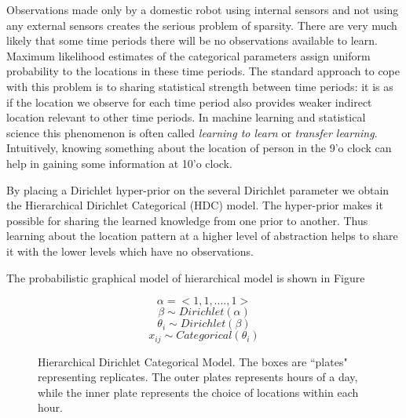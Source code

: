 Observations made only by a domestic robot using internal sensors and not using any external sensors creates the serious problem of sparsity. There are very much likely that some time periods there will be no observations available to learn. Maximum likelihood estimates of the categorical parameters assign uniform probability to the locations in these time periods. The standard approach to cope with this problem is to sharing statistical strength between time periods: it is as if the location we observe for each time period also provides weaker indirect location relevant to other time periods. In machine learning and statistical science this phenomenon is often called \emph{learning to learn} or \emph{transfer learning}. Intuitively, knowing something about the location of person in the 9'o clock can help in gaining some information at 10'o clock. 

By placing a Dirichlet hyper-prior on the several Dirichlet parameter we obtain the  Hierarchical Dirichlet Categorical  (HDC) model. The hyper-prior makes it possible for sharing the learned knowledge from one prior to another. Thus learning about the location pattern at a higher level of abstraction helps to share it with the lower levels which have no observations.

The probabilistic graphical model of  hierarchical model is shown in Figure \cite{hdcm}

\noindent
\begin{figure}[htp]

\begin{minipage}{0.3\textwidth}
\centering


\end{minipage}%
\begin{minipage}{0.7\textwidth}

\begin{equation*}
	\alpha = <1, 1, .... , 1 > 
\end{equation*}
\begin{equation*}
	\beta \sim Dirichlet (\alpha)
\end{equation*}
\begin{equation*}
	\theta_i  \sim Dirichlet (\beta)
\end{equation*}
\begin{equation*}
	x_{ij} \sim Categorical (\theta_i)
\end{equation*}
\end{minipage}
\caption[Hierarchical dirichlet categorical graphical model representation]{Hierarchical Dirichlet Categorical Model. The boxes are ``plates" representing replicates. The outer plates represents hours of a day, while the inner plate represents the choice of locations within each hour.}
\label{hdcm}
\end{figure}

